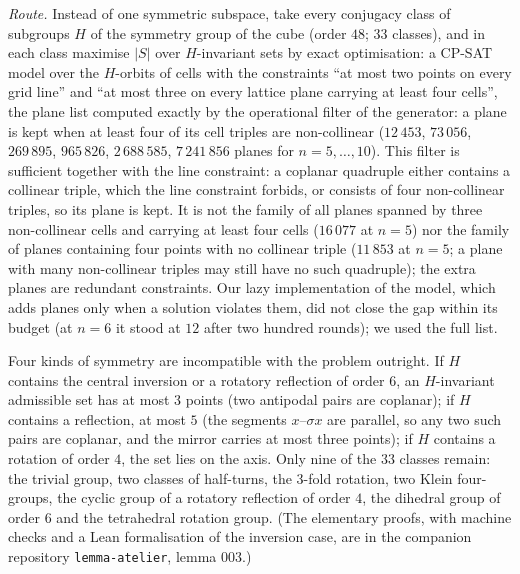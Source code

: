 \documentclass[11pt,a4paper]{article}
\begin{document}
\emph{Route.}  Instead of one symmetric subspace, take every conjugacy class of subgroups $H$
of the symmetry group of the cube (order $48$; $33$ classes), and in each class maximise $|S|$
over $H$-invariant sets by exact optimisation: a CP-SAT model over the $H$-orbits of cells with the
constraints ``at most two points on every grid line'' and ``at most three on every lattice plane
carrying at least four cells'', the plane list computed exactly by the operational filter of the generator: a plane
is kept when at least four of its cell triples are non-collinear ($12\,453$, $73\,056$, $269\,895$, $965\,826$,
$2\,688\,585$, $7\,241\,856$ planes for $n=5,\dots,10$).  This filter is sufficient together with the line constraint:
a coplanar quadruple either contains a collinear triple, which the line constraint forbids, or consists of four
non-collinear triples, so its plane is kept.  It is not the family of all planes spanned by three non-collinear cells and carrying at least four cells
($16\,077$ at $n=5$) nor the family of planes containing four points with no collinear triple ($11\,853$ at $n=5$;
a plane with many non-collinear triples may still have no such quadruple); the extra planes are redundant
constraints.  Our lazy implementation of the model,
which adds planes only when a solution violates them, did not close the gap within its budget (at
$n=6$ it stood at $12$ after two hundred rounds); we used the full list.

Four kinds of symmetry are incompatible with the problem outright.  If $H$ contains the central
inversion or a rotatory reflection of order $6$, an $H$-invariant admissible set has at most $3$
points (two antipodal pairs are coplanar); if $H$ contains a reflection, at most $5$ (the segments
$x$--$\sigma x$ are parallel, so any two such pairs are coplanar, and the mirror carries at most
three points); if $H$ contains a rotation of order $4$, the set lies on the axis.  Only nine of the
$33$ classes remain: the trivial group, two classes of half-turns, the $3$-fold rotation, two
Klein four-groups, the cyclic group of a rotatory reflection of order $4$, the dihedral group
of order $6$ and the tetrahedral rotation group.  (The elementary proofs, with machine checks
and a Lean formalisation of the inversion case, are in the companion repository
\texttt{lemma-atelier}, lemma 003.)
\end{document}
